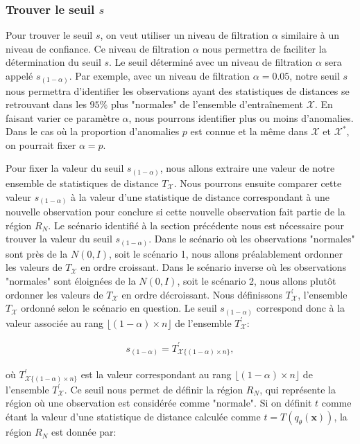 \subsubsection{Trouver le seuil $s$}

 Pour trouver le seuil $s$, on veut utiliser un niveau de filtration $\alpha$ similaire à un niveau de confiance. Ce niveau de filtration $\alpha$ nous permettra de faciliter la détermination du seuil $s$. Le seuil déterminé avec un niveau de filtration $\alpha$ sera appelé $s_{(1-\alpha)}$. Par exemple, avec un niveau de filtration $\alpha=0.05$, notre seuil $s$ nous permettra d'identifier les observations ayant des statistiques de distances se retrouvant dans les $95\%$ plus "normales" de l'ensemble d'entraînement $\mathcal{X}$. En faisant varier ce paramètre $\alpha$, nous pourrons identifier plus ou moins d'anomalies. Dans le cas où la proportion d'anomalies $p$ est connue et la même dans  $\mathcal{X}$ et $\mathcal{X}^*$, on pourrait fixer $\alpha=p$.

Pour fixer la valeur du  seuil $s_{(1-\alpha)}$, nous allons extraire une valeur de notre ensemble de statistiques de distance $T_{\mathcal{X}}$. Nous pourrons ensuite comparer cette valeur $s_{(1-\alpha)}$ à la valeur d'une statistique de distance  correspondant à une nouvelle observation pour conclure si cette nouvelle observation fait partie de la région $R_N$. Le scénario identifié à la section précédente nous est nécessaire pour trouver la valeur du seuil $s_{(1-\alpha)}$. Dans le scénario où les observations "normales" sont près de la $N(0,I)$, soit le scénario 1, nous allons préalablement ordonner les valeurs de $T_{\mathcal{X}}$ en ordre croissant. Dans le scénario inverse où les observations "normales" sont éloignées de la $N(0,I)$, soit le scénario 2, nous allons plutôt ordonner les valeurs de $T_{\mathcal{X}}$ en ordre décroissant. Nous définissons $T^{'}_{\mathcal{X}}$, l'ensemble $T_{\mathcal{X}}$ ordonné selon le scénario en question. Le seuil $s_{(1-\alpha)}$ correspond donc à la valeur associée au rang $\lfloor(1 - \alpha) \times n\rfloor$ de l'ensemble $T^{'}_{\mathcal{X}}$:

\begin{gather} \label{eq:seuil}
s_{(1 - \alpha)} = T^{'}_{\mathcal{X} \{(1 - \alpha) \times n\}},
\end{gather}

où $T^{'}_{\mathcal{X} \{(1 - \alpha) \times n\}}$ est la valeur correspondant au rang $\lfloor(1 - \alpha) \times n\rfloor$ de l'ensemble $T^{'}_{\mathcal{X}}$. Ce seuil nous permet de définir la région $R_N$, qui représente la région où une observation est considérée comme "normale". Si on définit $t$ comme étant la valeur d'une statistique de distance calculée comme $t = T(q_\theta(\boldsymbol{x}))$, la région $R_N$ est donnée par:

